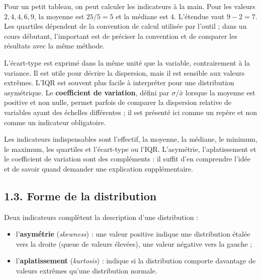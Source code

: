 \documentclass[
  french,
  letterpaper,
  open=any]{scrbook}
\providecommand{\tightlist}{%
  \setlength{\itemsep}{0pt}\setlength{\parskip}{0pt}}
\theoremstyle{definition}
\theoremstyle{definition}
\theoremstyle{remark}
\begin{document}
Pour un petit tableau, on peut calculer les indicateurs à la main. Pour
les valeurs \(2, 4, 4, 6, 9\), la moyenne est \(25/5=5\) et la médiane
est \(4\). L'étendue vaut \(9-2=7\). Les quartiles dépendent de la
convention de calcul utilisée par l'outil ; dans un cours débutant,
l'important est de préciser la convention et de comparer les résultats
avec la même méthode.

L'écart-type est exprimé dans la même unité que la variable,
contrairement à la variance. Il est utile pour décrire la dispersion,
mais il est sensible aux valeurs extrêmes. L'IQR est souvent plus facile
à interpréter pour une distribution asymétrique. Le \textbf{coefficient
de variation}, défini par \(\sigma/\bar{x}\) lorsque la moyenne est
positive et non nulle, permet parfois de comparer la dispersion relative
de variables ayant des échelles différentes ; il est présenté ici comme
un repère et non comme un indicateur obligatoire.

\begin{tcolorbox}[enhanced jigsaw, arc=.35mm, bottomrule=.15mm, bottomtitle=1mm, breakable, colback=white, colbacktitle=quarto-callout-note-color!10!white, colframe=quarto-callout-note-color-frame, coltitle=black, left=2mm, leftrule=.75mm, opacityback=0, opacitybacktitle=0.6, rightrule=.15mm, title=\textcolor{quarto-callout-note-color}{\faInfo}\hspace{0.5em}{Priorité pour débuter}, titlerule=0mm, toprule=.15mm, toptitle=1mm]

Les indicateurs indispensables sont l'effectif, la moyenne, la médiane,
le minimum, le maximum, les quartiles et l'écart-type ou l'IQR.
L'asymétrie, l'aplatissement et le coefficient de variation sont des
compléments : il suffit d'en comprendre l'idée et de savoir quand
demander une explication supplémentaire.

\end{tcolorbox}

\subsection{1.3. Forme de la
distribution}\label{forme-de-la-distribution}

Deux indicateurs complètent la description d'une distribution :

\begin{itemize}
\tightlist
\item
  l'\textbf{asymétrie} (\emph{skewness}) : une valeur positive indique
  une distribution étalée vers la droite (queue de valeurs élevées), une
  valeur négative vers la gauche ;
\item
  l'\textbf{aplatissement} (\emph{kurtosis}) : indique si la
  distribution comporte davantage de valeurs extrêmes qu'une
  distribution normale.
\end{itemize}
\end{document}
